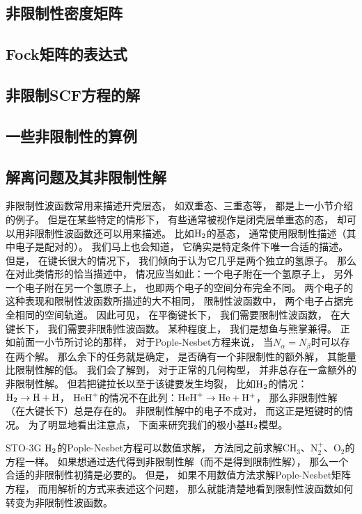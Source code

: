 \subsection{非限制性密度矩阵}
\subsection{Fock矩阵的表达式}
\subsection{非限制SCF方程的解}
\subsection{一些非限制性的算例}


\subsection{解离问题及其非限制性解}
非限制性波函数常用来描述开壳层态，
如双重态、三重态等，
都是上一小节介绍的例子。
但是在某些特定的情形下，
有些通常被视作是闭壳层单重态的态，
却可以用非限制性波函数还可以用来描述。
比如$\mathrm{H}_2$的基态，
通常使用限制性描述（其中电子是配对的）。
我们马上也会知道，
它确实是特定条件下唯一合适的\hft 描述。
但是，
在键长很大的情况下，
我们倾向于认为它几乎是两个独立的氢原子。
那么在对此类情形的恰当描述中，
情况应当如此：一个电子附在一个氢原子上，
另外一个电子附在另一个氢原子上，
也即两个电子的空间分布完全不同。
两个电子的这种表现和限制性波函数所描述的大不相同，
限制性波函数中，
两个电子占据完全相同的空间轨道。
因此可见，
在平衡键长下，
我们需要限制性波函数，
在大键长下，
我们需要非限制性波函数。
某种程度上，
我们是想鱼与熊掌兼得。
正如前面一小节所讨论的那样，
对于Pople-Nesbet方程来说，
当$N_\alpha=N_\beta$时可以存在两个解。
那么余下的任务就是确定，
是否确有一个非限制性的额外解，
其能量比限制性解的低。
我们会了解到，
对于正常的几何构型，
并非总存在一盒额外的非限制性解。
但若把键拉长以至于该键要发生均裂，
比如$\mathrm{H}_2$的情况：$\mathrm{H}_2\to \mathrm{H+H}$，
$\mathrm{HeH}^+$的情况不在此列：$\mathrm{HeH}^+\to \mathrm{He+H^+}$，
那么非限制性解（在大键长下）总是存在的。
非限制性解中的电子不成对，
而这正是短键时的情况。
为了明显地看出注意点，
下面来研究我们的极小基$\mathrm{H}_2$模型。


STO-3G $\mathrm{H}_2$的Pople-Nesbet方程可以数值求解，
方法同之前求解$\mathrm{CH_3}$、$\mathrm{N_2^+}$、$\mathrm{O_2}$的方程一样。
如果想通过迭代得到非限制性解（而不是得到限制性解），
那么一个合适的非限制性初猜是必要的。
但是，
如果不用数值方法求解Pople-Nesbet矩阵方程，
而用解析的方式来表述这个问题，
那么就能清楚地看到限制性波函数如何转变为非限制性波函数。

